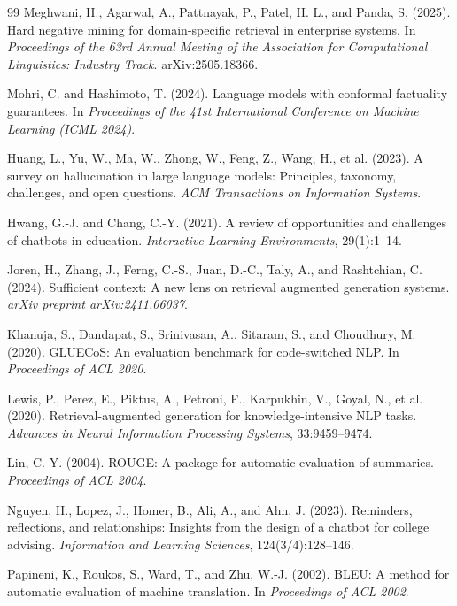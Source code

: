 \documentclass[a4paper,twoside]{article}
\begin{document}
{\begin{thebibliography}{99}
 Meghwani, H., Agarwal, A., Pattnayak, P., Patel, H. L., and Panda, S. (2025). Hard negative mining for domain-specific retrieval in enterprise systems. In \textit{Proceedings of the 63rd Annual Meeting of the Association for Computational Linguistics: Industry Track}. arXiv:2505.18366.

 Mohri, C. and Hashimoto, T. (2024). Language models with conformal factuality guarantees. In \textit{Proceedings of the 41st International Conference on Machine Learning (ICML 2024)}.

 Huang, L., Yu, W., Ma, W., Zhong, W., Feng, Z., Wang, H., et al. (2023). A survey on hallucination in large language models: Principles, taxonomy, challenges, and open questions. \textit{ACM Transactions on Information Systems}.

 Hwang, G.-J. and Chang, C.-Y. (2021). A review of opportunities and challenges of chatbots in education. \textit{Interactive Learning Environments}, 29(1):1--14.

 Joren, H., Zhang, J., Ferng, C.-S., Juan, D.-C., Taly, A., and Rashtchian, C. (2024). Sufficient context: A new lens on retrieval augmented generation systems. \textit{arXiv preprint arXiv:2411.06037}.

 Khanuja, S., Dandapat, S., Srinivasan, A., Sitaram, S., and Choudhury, M. (2020). GLUECoS: An evaluation benchmark for code-switched NLP. In \textit{Proceedings of ACL 2020}.

 Lewis, P., Perez, E., Piktus, A., Petroni, F., Karpukhin, V., Goyal, N., et al. (2020). Retrieval-augmented generation for knowledge-intensive NLP tasks. \textit{Advances in Neural Information Processing Systems}, 33:9459--9474.

 Lin, C.-Y. (2004). ROUGE: A package for automatic evaluation of summaries. \textit{Proceedings of ACL 2004}.

 Nguyen, H., Lopez, J., Homer, B., Ali, A., and Ahn, J. (2023). Reminders, reflections, and relationships: Insights from the design of a chatbot for college advising. \textit{Information and Learning Sciences}, 124(3/4):128--146.

 Papineni, K., Roukos, S., Ward, T., and Zhu, W.-J. (2002). BLEU: A method for automatic evaluation of machine translation. In \textit{Proceedings of ACL 2002}.


\end{thebibliography}}
\end{document}
